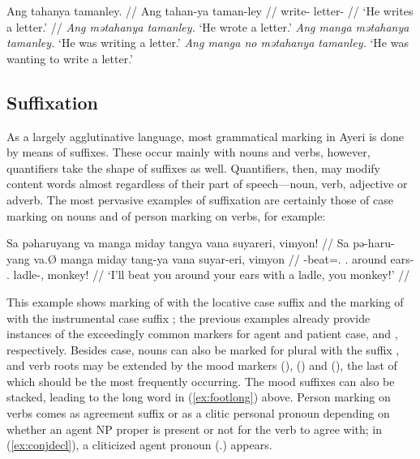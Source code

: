 \pex
	\a\begingl
		\gla Ang tahanya tamanley. //
		\glb Ang tahan-ya taman-ley //
		\glc \AgtT{} write-\TsgM{} letter-\PargI{} //
		\glft `He writes a letter.' //
	\endgl
	\a \textit{Ang mətahanya tamanley.} `He wrote a letter.'
	\a \textit{Ang manga mətahanya tamanley.} `He was writing a letter.'
	\a \textit{Ang manga no mətahanya tamanley.} `He was wanting to write a 
		letter.'
\xe



\subsection{Suffixation}

As a largely agglutinative language, most grammatical marking in Ayeri is done 
by means of suffixes. These occur mainly with nouns and verbs, however, 
quantifiers take the shape of suffixes as well. Quantifiers, then, may modify 
content words almost regardless of their part of speech---noun, verb, adjective 
or adverb. The most pervasive examples of suffixation are certainly those of 
case marking on nouns and of person marking on verbs, for example:

\ex\label{ex:conjdecl}\begingl
	\gla Sa pəharuyang va manga miday tangya vana suyareri, vimyon! //
	\glb Sa pə-haru-yang va.Ø manga miday tang-ya vana suyar-eri, vimyon //
	\glc \PatT{} \NFut{}-beat=\Fsg{}.\Aarg{} \Ssg{}.\Top{} \Dyn{} around 
		ears-\Loc{} \Ssg{}.\Gen{} ladle-\Ins{}, monkey! //
	\glft `I'll beat you around your ears with a ladle, you monkey!' //
\endgl\xe

This example shows marking of  with the locative case 
suffix  and the marking of  with the 
instrumental case suffix ; the previous examples already 
provide instances of the exceedingly common markers for agent and patient 
case,  and , respectively. Besides case, nouns 
can also be marked for plural with the suffix , and verb roots 
may be extended by the mood markers  (\Irr{}), 
 (\Hab{}) and  (\Neg{}), the last of which should 
be the most frequently occurring. The mood suffixes can also be stacked, leading 
to the long word in (\ref{ex:footlong}) above. Person marking on verbs comes as 
agreement suffix or as a clitic personal pronoun depending on whether an agent 
NP proper is present or not for the verb to agree with; in (\ref{ex:conjdecl}), 
a cliticized agent pronoun  (\TsgM{}.\Aarg{}) appears.

